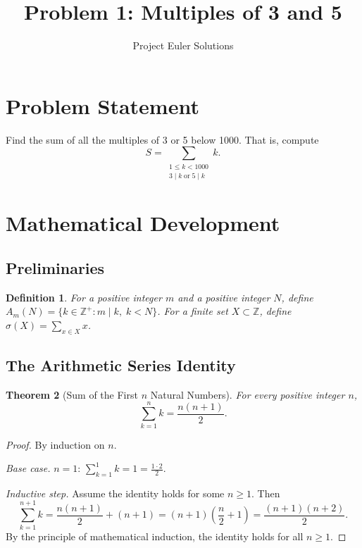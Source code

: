 \documentclass[11pt]{article}
\title{Problem 1: Multiples of 3 and 5}
\author{Project Euler Solutions}
\date{}
\newtheorem{theorem}{Theorem}
\newtheorem{definition}[theorem]{Definition}
\begin{document}
\maketitle

\section{Problem Statement}

Find the sum of all the multiples of 3 or 5 below 1000. That is, compute
\[
S = \sum_{\substack{1 \le k < 1000 \\ 3 \mid k \;\text{or}\; 5 \mid k}} k.
\]

\section{Mathematical Development}

\subsection{Preliminaries}

\begin{definition}
For a positive integer $m$ and a positive integer $N$, define $A_m(N) = \{k \in \mathbb{Z}^+ : m \mid k,\; k < N\}$. For a finite set $X \subset \mathbb{Z}$, define $\sigma(X) = \sum_{x \in X} x$.
\end{definition}

\subsection{The Arithmetic Series Identity}

\begin{theorem}[Sum of the First $n$ Natural Numbers]
\label{thm:gauss}
For every positive integer $n$,
\[
\sum_{k=1}^{n} k = \frac{n(n+1)}{2}.
\]
\end{theorem}

\begin{proof}
By induction on $n$.

\emph{Base case.} $n = 1$: $\sum_{k=1}^{1} k = 1 = \frac{1 \cdot 2}{2}$.

\emph{Inductive step.} Assume the identity holds for some $n \ge 1$. Then
\[
\sum_{k=1}^{n+1} k = \frac{n(n+1)}{2} + (n+1) = (n+1)\!\left(\frac{n}{2} + 1\right) = \frac{(n+1)(n+2)}{2}.
\]
By the principle of mathematical induction, the identity holds for all $n \ge 1$.
\end{proof}
\end{document}
